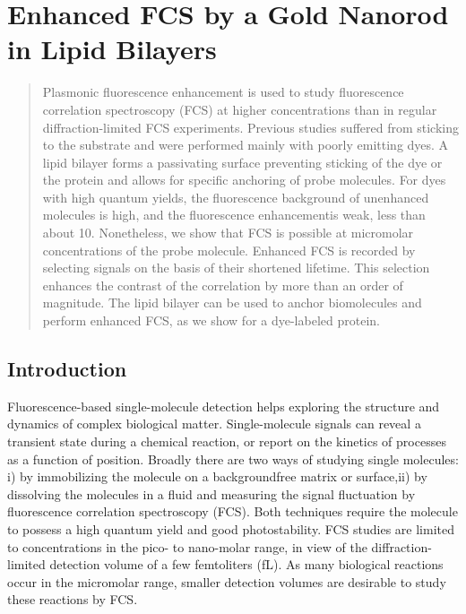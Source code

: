 \chapter{Enhanced FCS by a Gold Nanorod in Lipid Bilayers}
\label{chapter:EFCS}

\graphicspath{{chapters/c2_bilayer_efcs/figure/}}
\begin{abstract}
	Plasmonic fluorescence enhancement is used to study fluorescence correlation spectroscopy (FCS) at higher concentrations than in regular diffraction-limited FCS experiments.
	Previous studies suffered from sticking to the substrate and were performed mainly with poorly emitting dyes.
	A lipid bilayer forms a passivating surface preventing sticking of the dye or the protein and allows for specific anchoring of probe molecules.
	For dyes with high quantum yields, the fluorescence background of unenhanced molecules is high, and the fluorescence enhancementis weak, less than about 10.
	Nonetheless, we show that FCS is possible at micromolar concentrations of the probe molecule.
	Enhanced FCS is recorded by selecting signals on the basis of their shortened lifetime.
	This selection enhances the contrast of the correlation by more than an order of magnitude.
	The lipid bilayer can be used to anchor biomolecules and perform enhanced FCS, as we show for a dye-labeled protein.
\end{abstract}
\newpage
\section{Introduction}
Fluorescence-based single-molecule detection helps exploring the structure and dynamics of complex biological matter.\cite{moerner1999illuminating,weiss1999fluorescence}
Single-molecule signals can reveal a transient state during a chemical reaction, or report on the kinetics of processes as a function of position.
Broadly there are two ways of studying single molecules: i) by immobilizing the molecule on a backgroundfree matrix or surface,ii) by dissolving the molecules in a fluid and measuring the signal fluctuation by fluorescence correlation spectroscopy (FCS).\cite{Magde1972}
Both techniques require the molecule to possess a high quantum yield and good photostability.
FCS studies are limited to concentrations in the pico- to nano-molar range, in view of the diffraction-limited detection volume of a few femtoliters (fL).
As many biological reactions occur in the micromolar range\cite{craighead2006future}, smaller detection volumes are desirable to study these reactions by FCS.

